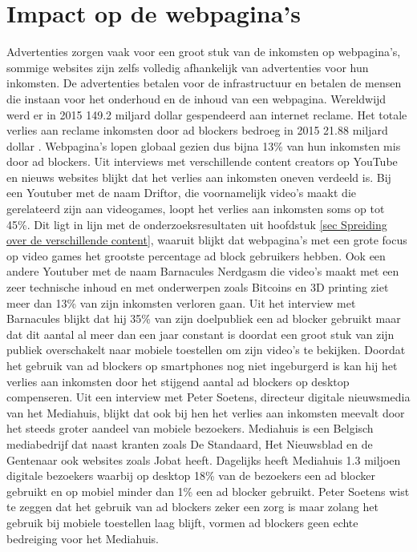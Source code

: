 \documentclass[pdftex,a4paper,12pt,twoside]{report}
\begin{document}
\section{Impact op de webpagina's}
\label{sec:Impact op de webpagina's}
Advertenties zorgen vaak voor een groot stuk van de inkomsten op webpagina's, sommige websites zijn zelfs volledig afhankelijk van advertenties voor hun inkomsten. De advertenties betalen voor de infrastructuur en betalen de mensen die instaan voor het onderhoud en de inhoud van een webpagina. Wereldwijd werd er in 2015 149.2 miljard dollar gespendeerd aan internet reclame. Het totale verlies aan reclame inkomsten door ad blockers bedroeg in 2015 21.88 miljard dollar \cite{PageFair2015}. Webpagina's lopen globaal gezien dus bijna 13\% van hun inkomsten mis door ad blockers. Uit interviews met verschillende content creators op YouTube en nieuws websites blijkt dat het verlies aan inkomsten oneven verdeeld is. Bij een Youtuber met de naam Driftor, die voornamelijk video's maakt die gerelateerd zijn aan videogames, loopt het verlies aan inkomsten soms op tot 45\%. Dit ligt in lijn met de onderzoeksresultaten uit hoofdstuk \ref{sec Spreiding over de verschillende content}, waaruit blijkt dat webpagina's met een grote focus op video games het grootste percentage ad block gebruikers hebben. Ook een andere Youtuber met de naam Barnacules Nerdgasm die video's maakt met een zeer technische inhoud en met onderwerpen zoals Bitcoins en 3D printing ziet meer dan 13\% van zijn inkomsten verloren gaan. Uit het interview met Barnacules blijkt dat hij 35\% van zijn doelpubliek een ad blocker gebruikt maar dat dit aantal al meer dan een jaar constant is doordat een groot stuk van zijn publiek overschakelt naar mobiele toestellen om zijn video's te bekijken. Doordat het gebruik van ad blockers op smartphones nog niet ingeburgerd is kan hij het verlies aan inkomsten door het stijgend aantal ad blockers op desktop compenseren.
Uit een interview met Peter Soetens, directeur digitale nieuwsmedia van het Mediahuis, blijkt dat ook bij hen het verlies aan inkomsten meevalt door het steeds groter aandeel van mobiele bezoekers. Mediahuis is een Belgisch mediabedrijf dat naast kranten zoals De Standaard, Het Nieuwsblad en de Gentenaar ook websites zoals Jobat heeft. Dagelijks heeft Mediahuis 1.3 miljoen digitale bezoekers waarbij op desktop 18\% van de bezoekers een ad blocker gebruikt en op mobiel minder dan 1\% een ad blocker gebruikt. Peter Soetens wist te zeggen dat het gebruik van ad blockers zeker een zorg is maar zolang het gebruik bij mobiele toestellen laag blijft, vormen ad blockers geen echte bedreiging voor het Mediahuis.
\end{document}
